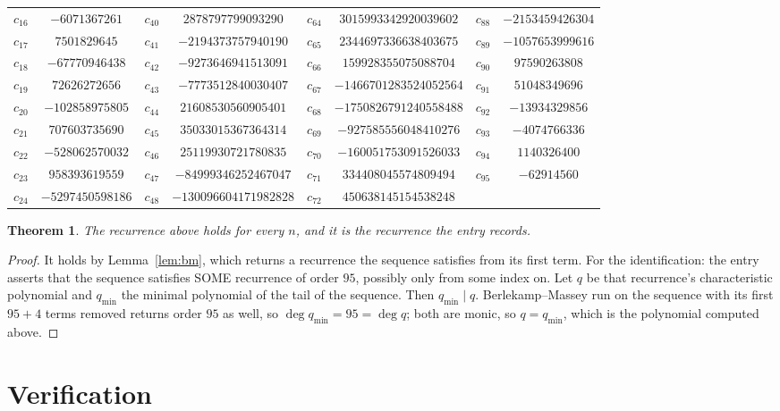 \documentclass[11pt,a4paper]{article}
\theoremstyle{plain}
\newtheorem{theorem}{Theorem}
\theoremstyle{definition}
\begin{document}
\begin{center}
\begin{tabular}{cccccccc}
$c_{16}$ & $-6071367261$ & $c_{40}$ & $2878797799093290$ & $c_{64}$ & $3015993342920039602$ & $c_{88}$ & $-2153459426304$ \\
$c_{17}$ & $7501829645$ & $c_{41}$ & $-2194373757940190$ & $c_{65}$ & $2344697336638403675$ & $c_{89}$ & $-1057653999616$ \\
$c_{18}$ & $-67770946438$ & $c_{42}$ & $-9273646941513091$ & $c_{66}$ & $159928355075088704$ & $c_{90}$ & $97590263808$ \\
$c_{19}$ & $72626272656$ & $c_{43}$ & $-7773512840030407$ & $c_{67}$ & $-1466701283524052564$ & $c_{91}$ & $51048349696$ \\
$c_{20}$ & $-102858975805$ & $c_{44}$ & $21608530560905401$ & $c_{68}$ & $-1750826791240558488$ & $c_{92}$ & $-13934329856$ \\
$c_{21}$ & $707603735690$ & $c_{45}$ & $35033015367364314$ & $c_{69}$ & $-927585556048410276$ & $c_{93}$ & $-4074766336$ \\
$c_{22}$ & $-528062570032$ & $c_{46}$ & $25119930721780835$ & $c_{70}$ & $-160051753091526033$ & $c_{94}$ & $1140326400$ \\
$c_{23}$ & $958393619559$ & $c_{47}$ & $-84999346252467047$ & $c_{71}$ & $334408045574809494$ & $c_{95}$ & $-62914560$ \\
$c_{24}$ & $-5297450598186$ & $c_{48}$ & $-130096604171982828$ & $c_{72}$ & $450638145154538248$ &  &  \\
\end{tabular}
\end{center}

\begin{theorem}
The recurrence above holds for every $n$, and it is the recurrence the entry records.
\end{theorem}

\begin{proof}
It holds by Lemma~\ref{lem:bm}, which returns a recurrence the sequence satisfies from its
first term. For the identification: the entry asserts that the sequence satisfies SOME
recurrence of order $95$, possibly only from some index on. Let $q$ be that recurrence's
characteristic polynomial and $q_{\min}$ the minimal polynomial of the tail of the sequence.
Then $q_{\min}\mid q$. Berlekamp--Massey run on the sequence with its first $95+4$ terms
removed returns order $95$ as well, so $\deg q_{\min}=95=\deg q$; both are monic, so
$q=q_{\min}$, which is the polynomial computed above.
\end{proof}

\section{Verification}
\end{document}
